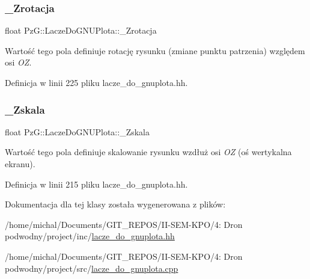 \mbox{\label{class_pz_g_1_1_lacze_do_g_n_u_plota_aa65781b1ff96dfb31a780e98ee28d6ed}} 
\subsubsection{\texorpdfstring{\+\_\+\+Zrotacja}{\_Zrotacja}}
{\footnotesize\ttfamily float Pz\+G\+::\+Lacze\+Do\+G\+N\+U\+Plota\+::\+\_\+\+Zrotacja\hspace{0.3cm}{\ttfamily [protected]}}

Wartość tego pola definiuje rotację rysunku (zmiane punktu patrzenia) względem osi {\itshape OZ}. 

Definicja w linii 225 pliku lacze\+\_\+do\+\_\+gnuplota.\+hh.

\mbox{\label{class_pz_g_1_1_lacze_do_g_n_u_plota_a85446d06b2d714b2f852ef43c47c73c1}} 
\subsubsection{\texorpdfstring{\+\_\+\+Zskala}{\_Zskala}}
{\footnotesize\ttfamily float Pz\+G\+::\+Lacze\+Do\+G\+N\+U\+Plota\+::\+\_\+\+Zskala\hspace{0.3cm}{\ttfamily [protected]}}

Wartość tego pola definiuje skalowanie rysunku wzdłuż osi {\itshape OZ} (oś wertykalna ekranu). 

Definicja w linii 215 pliku lacze\+\_\+do\+\_\+gnuplota.\+hh.



Dokumentacja dla tej klasy została wygenerowana z plików\+:\begin{DoxyCompactItemize}
\item 
/home/michal/\+Documents/\+G\+I\+T\+\_\+\+R\+E\+P\+O\+S/\+I\+I-\/\+S\+E\+M-\/\+K\+P\+O/4\+: Dron podwodny/project/inc/\hyperlink{lacze__do__gnuplota_8hh}{lacze\+\_\+do\+\_\+gnuplota.\+hh}\item 
/home/michal/\+Documents/\+G\+I\+T\+\_\+\+R\+E\+P\+O\+S/\+I\+I-\/\+S\+E\+M-\/\+K\+P\+O/4\+: Dron podwodny/project/src/\hyperlink{lacze__do__gnuplota_8cpp}{lacze\+\_\+do\+\_\+gnuplota.\+cpp}\end{DoxyCompactItemize}
